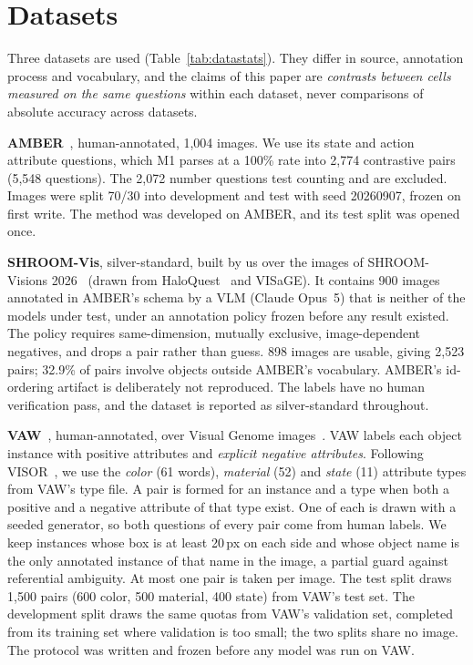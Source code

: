\documentclass[11pt]{article}
\begin{document}
\section{Datasets}\label{sec:data}
Three datasets are used (Table~\ref{tab:datastats}). They differ in source, annotation process and vocabulary, and the claims of this paper are \emph{contrasts between cells measured on the same questions} within each dataset, never comparisons of absolute accuracy across datasets.

\textbf{AMBER}~\cite{wang2023amber}, human-annotated, 1{,}004 images. We use its state and action attribute questions, which M1 parses at a 100\% rate into 2{,}774 contrastive pairs (5{,}548 questions). The 2{,}072 number questions test counting and are excluded. Images were split 70/30 into development and test with seed 20260907, frozen on first write. The method was developed on AMBER, and its test split was opened once.

\textbf{SHROOM-Vis}, silver-standard, built by us over the images of SHROOM-Visions 2026~\cite{vazquez2026shroomvisions} (drawn from HaloQuest~\cite{wang2024haloquest} and VISaGE). It contains 900 images annotated in AMBER's schema by a VLM (Claude Opus~5) that is neither of the models under test, under an annotation policy frozen before any result existed. The policy requires same-dimension, mutually exclusive, image-dependent negatives, and drops a pair rather than guess. 898 images are usable, giving 2{,}523 pairs; 32.9\% of pairs involve objects outside AMBER's vocabulary. AMBER's id-ordering artifact is deliberately not reproduced. The labels have no human verification pass, and the dataset is reported as silver-standard throughout.

\textbf{VAW}~\cite{pham2021vaw}, human-annotated, over Visual Genome images~\cite{krishna2017visualgenome}. VAW labels each object instance with positive attributes and \emph{explicit negative attributes}. Following VISOR~\cite{zhang2026visor}, we use the \emph{color} (61 words), \emph{material} (52) and \emph{state} (11) attribute types from VAW's type file. A pair is formed for an instance and a type when both a positive and a negative attribute of that type exist. One of each is drawn with a seeded generator, so both questions of every pair come from human labels. We keep instances whose box is at least 20\,px on each side and whose object name is the only annotated instance of that name in the image, a partial guard against referential ambiguity. At most one pair is taken per image. The test split draws 1{,}500 pairs (600 color, 500 material, 400 state) from VAW's test set. The development split draws the same quotas from VAW's validation set, completed from its training set where validation is too small; the two splits share no image. The protocol was written and frozen before any model was run on VAW.
\end{document}
